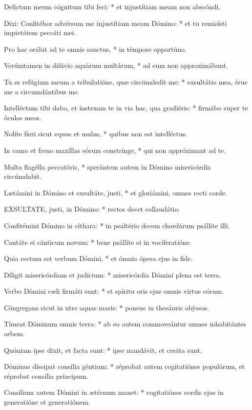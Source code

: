 Delíctum meum cógnitum tibi feci: * et injustítiam meam non abscóndi.

Dixi: Confitébor advérsum me injustítiam meam Dómino: * et tu remisísti impietátem peccáti mei.

Pro hac orábit ad te omnis sanctus, * in témpore opportúno.

Verúmtamen in dilúvio aquárum multárum, * ad eum non approximábunt.

Tu es refúgium meum a tribulatióne, quæ circúmdedit me: * exsultátio mea, érue me a circumdántibus me.

Intelléctum tibi dabo, et ínstruam te in via hac, qua gradiéris: * firmábo super te óculos meos.

Nolíte fíeri sicut equus et mulus, * quibus non est intelléctus.

In camo et freno maxíllas eórum constrínge, * qui non appróximant ad te.

Multa flagélla peccatóris, * sperántem autem in Dómino misericórdia circúmdabit.

Lætámini in Dómino et exsultáte, justi, * et gloriámini, omnes recti corde.


\lettrine[lines=2]{E}{XSULTATE}, justi, in Dómino: * rectos decet collaudátio.

Confitémini Dómino in cíthara: * in psaltério decem chordárum psállite illi.

Cantáte ei cánticum novum: * bene psállite ei in vociferatióne.

Quia rectum est verbum Dómini, * et ómnia ópera ejus in fide.

Díligit misericórdiam et judícium: * misericórdia Dómini plena est terra.

Verbo Dómini cæli firmáti sunt: * et spíritu oris ejus omnis virtus eórum.

Cóngregans sicut in utre aquas maris: * ponens in thesáuris abýssos.

Tímeat Dóminum omnis terra: * ab eo autem commoveántur omnes inhabitántes orbem.

Quóniam ipse dixit, et facta sunt: * ipse mandávit, et creáta sunt.

Dóminus díssipat consília géntium: * réprobat autem cogitatiónes populórum, et réprobat consília príncipum.

Consílium autem Dómini in ætérnum manet: * cogitatiónes cordis ejus in generatióne et generatiónem.


